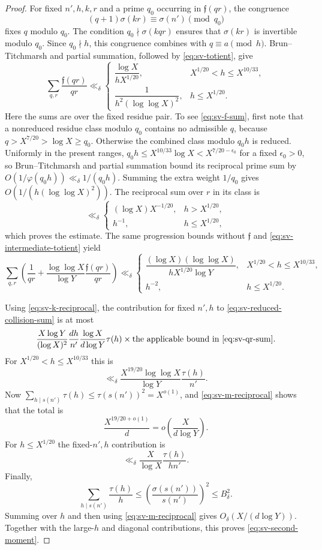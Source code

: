 \documentclass[11pt,letterpaper,reqno]{amsart}
\numberwithin{equation}{section}
\theoremstyle{remark}
\newcommand{\1}{\mathbf 1}
\renewcommand{\leq}{\leqslant}
\renewcommand{\geq}{\geqslant}
\begin{document}
\begin{proof}
For fixed $n',h,k,r$ and a prime $q_0$ occurring in
$\mathfrak{f}(qr)$, the congruence
\[
 (q+1)\sigma(kr)\equiv\sigma(n')\pmod{q_0}
\]
fixes $q$ modulo $q_0$. The condition
$q_0\nmid\sigma(kqr)$ ensures that $\sigma(kr)$ is invertible modulo
$q_0$. Since $q_0\nmid h$, this congruence combines with
$q\equiv a\pmod h$. Brun--Titchmarsh and partial summation, followed by
\eqref{eq:sv-totient}, give
\begin{equation}\label{eq:sv-f-sum}
 \sum_{q,r}\frac{\mathfrak{f}(qr)}{qr}
 \ll_\delta
 \begin{cases}
 \dfrac{\log X}{hX^{1/20}},&X^{1/20}<h\leq X^{10/33},\\[6pt]
 \dfrac{1}{h^2(\log\log X)^2},&h\leq X^{1/20}.
 \end{cases}
\end{equation}
Here the sums are over the fixed residue pair. To see
\eqref{eq:sv-f-sum}, first note that a nonreduced residue class modulo
$q_0$ contains no admissible $q$, because $q>X^{7/20}>\log X\geq q_0$.
Otherwise the combined class modulo $q_0 h$ is reduced. Uniformly in
the present ranges,
$q_0 h\leq X^{10/33}\log X<X^{7/20-\epsilon_0}$ for a fixed
$\epsilon_0>0$, so Brun--Titchmarsh and partial summation bound its
reciprocal prime sum by
$O(1/\varphi(q_0 h))\ll_\delta1/(q_0 h)$. Summing the extra weight
$1/q_0$ gives $O(1/(h(\log\log X)^2))$. The reciprocal sum over $r$ in its
class is
\[
 \ll_\delta
 \begin{cases}
 (\log X)X^{-1/20},&h>X^{1/20},\\
 h^{-1},&h\leq X^{1/20},
 \end{cases}
\]
which proves the estimate. The same progression bounds without
$\mathfrak{f}$ and \eqref{eq:sv-intermediate-totient} yield
\begin{equation}\label{eq:sv-qr-sum}
 \sum_{q,r}\left(\frac1{qr}
 +\frac{\log\log X}{\log Y}\frac{\mathfrak{f}(qr)}{qr}\right)
 \ll_\delta
 \begin{cases}
 \dfrac{(\log X)(\log\log X)}{hX^{1/20}\log Y},
 &X^{1/20}<h\leq X^{10/33},\\[6pt]
 h^{-2},&h\leq X^{1/20}.
 \end{cases}
\end{equation}

Using \eqref{eq:sv-k-reciprocal}, the contribution for fixed $n',h$ to
\eqref{eq:sv-reduced-collision-sum} is at most
\[
 \frac{X\log Y}{(\log X)^2}\frac{dh}{n'}
 \frac{\log X}{d\log Y}\tau(h)
 \times\text{the applicable bound in \eqref{eq:sv-qr-sum}}.
\]
For $X^{1/20}<h\leq X^{10/33}$ this is
\[
 \ll_\delta
 \frac{X^{19/20}\log\log X}{\log Y}\frac{\tau(h)}{n'}.
\]
Now $\sum_{h\mid s(n')}\tau(h)\leq\tau(s(n'))^2=X^{o(1)}$, and
\eqref{eq:sv-m-reciprocal} shows that the total is
\[
 \frac{X^{19/20+o(1)}}d
 =o\!\left(\frac{X}{d\log Y}\right).
\]
For $h\leq X^{1/20}$ the fixed-$n',h$ contribution is
\[
 \ll_\delta\frac{X}{\log X}\frac{\tau(h)}{hn'}.
\]
Finally,
\[
 \sum_{h\mid s(n')}\frac{\tau(h)}h
 \leq\left(\frac{\sigma(s(n'))}{s(n')}\right)^2
 \leq B_\delta^2.
\]
Summing over $h$ and then using \eqref{eq:sv-m-reciprocal} gives
$O_\delta(X/(d\log Y))$. Together with the large-$h$ and diagonal
contributions, this proves \eqref{eq:sv-second-moment}.
\end{proof}
\end{document}
